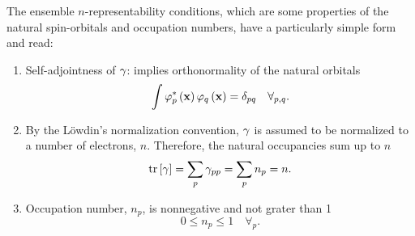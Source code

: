 The ensemble $n$-representability conditions, which are some properties of the 
natural spin-orbitals and occupation numbers, have a particularly simple 
form and read:
\begin{enumerate}
    \item Self-adjointness of $\gamma$: implies orthonormality of the natural orbitals 
        \begin{equation} \label{ec:self-adjoint-condition}
            \int
            \varphi_p^{*} \left( \boldsymbol{\mathrm{x}} \right)
            \varphi_q \left( \boldsymbol{\mathrm{x}} \right)
            = \delta_{pq}
            \quad \forall_{p,q} 
            .
        \end{equation}
        
    \item By the Löwdin's normalization convention,
        $\gamma$ is assumed to be normalized to a number of electrons, $n$.
        Therefore, the natural occupancies sum up to $n$  
        \begin{equation} \label{ec:normalization-condition}
            \trace \left[ \fordm \right] =
            \sum_{p} \fordm_{pp} =
            \sum_{p} n_p =
            n
            .
        \end{equation}

    \item Occupation number, $n_p$, is nonnegative and not grater than 1 
    \begin{equation} \label{ec:occ-number-condition}
        0 \leq n_p \leq 1 \quad \forall_{p}
        .
    \end{equation}
\end{enumerate}

